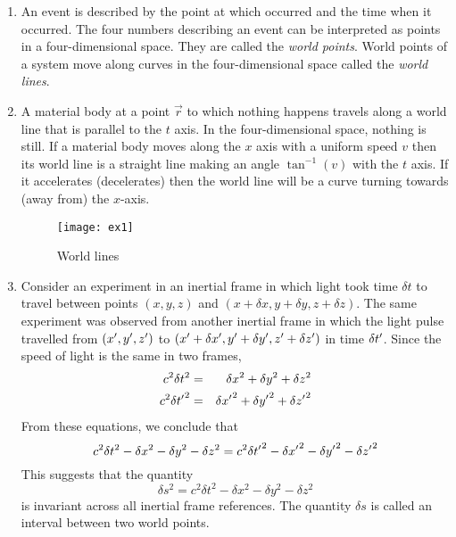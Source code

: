 \begin{enumerate}
\item An event is described by the point at which occurred and the time when it
occurred. The four numbers describing an event can be interpreted as points in a
four-dimensional space. They are called the \emph{world points}. World points of
a system move along curves in the four-dimensional space called the \emph{world 
lines}.

\item A material body at a point $\vec{r}$ to which nothing happens travels along
a world line that is parallel to the $t$ axis. In the four-dimensional space, nothing
is still. If a material body moves along the $x$ axis with a uniform speed $v$ then
its world line is a straight line making an angle $\tan^{-1}(v)$ with the $t$ axis.
If it accelerates (decelerates) then the world line will be a curve turning towards 
(away from) the $x$-axis. 
\begin{figure}
\texttt{[image: ex1]}
\caption{World lines}
\label{c1f1}
\end{figure}

\item Consider an experiment in an inertial frame in which light took time 
$\delta t$ to travel between points $(x, y, z)$ and $(x + \delta x, y + 
\delta y, z + \delta z)$. The same experiment was observed from another inertial 
frame in which the light pulse travelled from $(x^\prime, y^\prime, z^\prime)$ to $(x^\prime 
+ \delta x^\prime, y^\prime + \delta y^\prime, z^\prime + \delta z^\prime)$ in time $\delta t^\prime$.
Since the speed of light is the same in two frames,
\begin{eqnarray}
c^2\delta t^2 &=& \delta x^2 + \delta y^2 + \delta z^2 \label{c1e2} \\
c^2\delta {t^\prime}^2 &=& \delta {x^\prime}^2 + \delta {y^\prime}^2 + \delta {z^\prime}^2 \label{c1e3}
\end{eqnarray}
From these equations, we conclude that
\begin{equation}\label{c1e4}
c^2\delta t^2 - \delta x^2 - \delta y^2 - \delta z^2 = 
c^2\delta {t^\prime}^2 - \delta {x^\prime}^2 - \delta {y^\prime}^2 - \delta {z^\prime}^2
\end{equation}
This suggests that the quantity 
\begin{equation}\label{c1e5}
\delta s^2 = c^2\delta t^2 - \delta x^2 - \delta y^2 - \delta z^2
\end{equation}
is invariant across all inertial frame references. The quantity $\delta s$ is
called an interval between two world points.


\end{enumerate}
